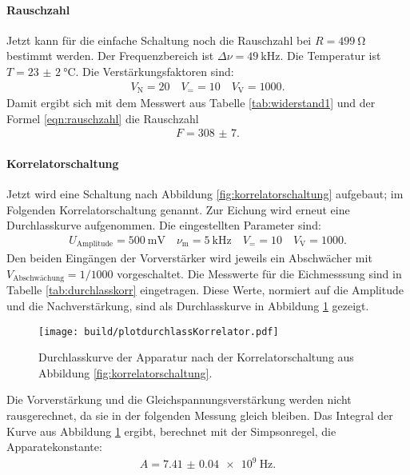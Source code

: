 \paragraph{Rauschzahl}

Jetzt kann für die einfache Schaltung noch die Rauschzahl bei $R = \SI{499}{\ohm}$ bestimmt werden. Der Frequenzbereich ist $\Delta \nu = \SI{49}{\kilo\hertz}$. Die Temperatur ist $T = \SI{23(2)}{\celsius}$. Die Verstärkungsfaktoren sind:
\begin{align*}
  V_\text{N} = 20 \quad V_= = 10 \quad V_\text{V} = 1000.
\end{align*}
Damit ergibt sich mit dem Messwert aus Tabelle \ref{tab:widerstand1} und der Formel \eqref{eqn:rauschzahl} die Rauschzahl
\begin{align}
  F = \num{308(7)}.
\end{align}


\paragraph{Korrelatorschaltung}

Jetzt wird eine Schaltung nach Abbildung \ref{fig:korrelatorschaltung} aufgebaut; im Folgenden Korrelatorschaltung genannt. Zur Eichung wird erneut eine Durchlasskurve aufgenommen. Die eingestellten Parameter sind:
\begin{align*}
  U_\text{Amplitude} = \SI{500}{\milli\volt} \quad \nu_\text{m} = \SI{5}{\kilo\hertz}\quad V_= = 10 \quad V_\text{V} = 1000.
\end{align*}
Den beiden Eingängen der Vorverstärker wird jeweils ein Abschwächer mit $V_\text{Abschwächung} = 1/1000$ vorgeschaltet.
Die Messwerte für die Eichmesssung sind in Tabelle \ref{tab:durchlasskorr} eingetragen.
Diese Werte, normiert auf die Amplitude und die Nachverstärkung, sind als Durchlasskurve in Abbildung \ref{fig:plotdurchlasskorr} gezeigt.
\begin{figure}
  \centering
  \texttt{[image: build/plotdurchlassKorrelator.pdf]}
  \caption{Durchlasskurve der Apparatur nach der Korrelatorschaltung aus Abbildung \ref{fig:korrelatorschaltung}.}
  \label{fig:plotdurchlasskorr}
\end{figure}
Die Vorverstärkung und die Gleichspannungsverstärkung werden nicht rausgerechnet, da sie in der folgenden Messung gleich bleiben. Das Integral der Kurve aus Abbildung \ref{fig:plotdurchlasskorr} ergibt, berechnet mit der Simpsonregel, die Apparatekonstante:
\begin{align}
  A = \SI{7.41(4)e9}{\hertz}.
\end{align}

